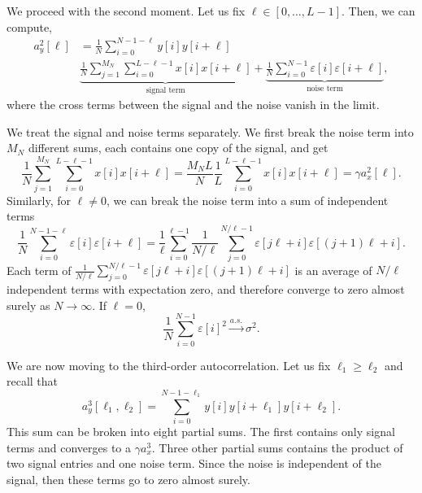 \documentclass[english]{article}
\numberwithin{equation}{section}
\theoremstyle{plain}
\theoremstyle{definition}
\theoremstyle{remark}
\theoremstyle{plain}
\theoremstyle{remark}
\theoremstyle{plain}
\theoremstyle{plain}
\begin{document}
We proceed with the second moment. Let us fix $\ell\in[0,\ldots,L-1]$. Then, we can compute, 
\begin{equation}
\begin{split}
a_y^2[\ell] & = \frac{1}{N}\sum_{i=0}^{N-1-\ell}y[i]y[i+\ell] \\
& \underbrace{\frac{1}{N}\sum_{j=1}^{M_N}\sum_{i=0}^{L-\ell-1}x[i]x[i+\ell]}_{\text{signal term}} + \underbrace{\frac{1}{N}\sum_{i=0}^{N-1}\varepsilon[i]\varepsilon[i+\ell]}_{\text{noise term}},
\end{split}
\end{equation}
where the cross terms between the signal and the noise vanish in the limit. 

We treat the signal and noise terms separately. We first break the noise term into $M_N$ different sums, each contains one copy of the signal, and get
\begin{equation}
\frac{1}{N}\sum_{j=1}^{M_N}\sum_{i=0}^{L-\ell-1}x[i]x[i+\ell] = \frac{M_NL}{N}\frac{1}{L}\sum_{i=0}^{L-\ell-1}x[i]x[i+\ell] = \gamma a_x^2[\ell].
\end{equation}
Similarly, for $\ell\neq 0$, we can break the noise term into a sum of independent terms 
\begin{equation}
\frac{1}{N}\sum_{i=0}^{N-1-\ell} \varepsilon[i]\varepsilon[i+\ell] = \frac{1}{\ell}\sum_{i=0}^{\ell-1}\frac{1}{N/\ell}\sum_{j=0}^{N/\ell -1} \varepsilon[j\ell + i] \varepsilon[(j+1)\ell + i].
\end{equation}
Each term of $\frac{1}{N/\ell}\sum_{j=0}^{N/\ell -1} \varepsilon[j\ell + i] \varepsilon[(j+1)\ell + i]$ is an average of $N/\ell$ independent terms with expectation zero, and therefore converge to zero almost surely as $N\to\infty$.
If $\ell=0$, 
\begin{equation}
\frac{1}{N}\sum_{i=0}^{N-1} \varepsilon[i]^2 \xrightarrow{a.s.} \sigma^2.
\end{equation}

We are now moving to the third-order autocorrelation. Let us fix $\ell_1\geq\ell_2$ and recall that 
\begin{equation*}
a_y^3[\ell_1,\ell_2] = \sum_{i=0}^{N-1-\ell_1} y[i]y[i+\ell_1]y[i+\ell_2]. 
\end{equation*}
This sum can be broken into eight partial sums. The first contains only signal terms and converges to a $\gamma a_x^3$. Three other partial sums contains the product of two signal entries and one noise term. Since the noise is independent of the signal, then these terms go to zero almost surely.
\end{document}
